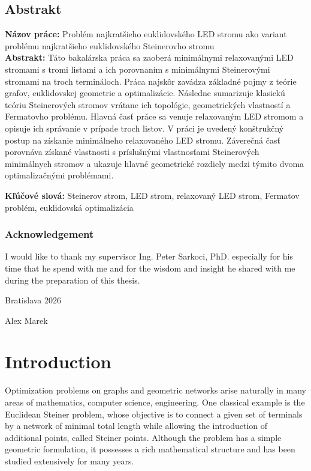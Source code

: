 \documentclass[openany]{book}
\begin{document}
	\section*{Abstrakt}
	
	\noindent \textbf{Názov práce:} Problém najkratšieho euklidovského LED stromu ako variant problému najkratšieho euklidovského Steinerovho stromu\\
	\textbf{Abstrakt:} 
	Táto bakalárska práca sa zaoberá minimálnymi relaxovanými LED stromami s tromi listami a ich porovnaním s minimálnymi Steinerovými stromami na troch termináloch. Práca najskôr zavádza základné pojmy z teórie grafov, euklidovskej geometrie a optimalizácie. Následne sumarizuje klasickú teóriu Steinerových stromov vrátane ich topológie, geometrických vlastností a Fermatovho problému. Hlavná časť práce sa venuje relaxovaným LED stromom a opisuje ich správanie v prípade troch listov. V práci je uvedený konštrukčný postup na získanie minimálneho relaxovaného LED stromu. Záverečná časť porovnáva získané vlastnosti s príslušnými vlastnosťami Steinerových minimálnych stromov a ukazuje hlavné geometrické rozdiely medzi týmito dvoma optimalizačnými problémami.
	
	\vspace{5pt}
	
	\noindent \textbf{Kľúčové slová:} Steinerov strom, LED strom, relaxovaný LED strom, Fermatov problém, euklidovská optimalizácia
	\clearpage
	\thispagestyle{empty}
	\mbox{}


	\vfill
	
	\subsection*{Acknowledgement}
	
	I would like to thank my supervisor Ing. Peter Sarkoci, PhD. especially for his time that he spend with me and for the wisdom and insight he shared with me during the preparation of this thesis.
	
	\vspace{10pt}
	
	\noindent Bratislava 2026 \hfill
	\newline
	
	\begin{flushright}
		Alex Marek \qquad
	\end{flushright}
	
		\tableofcontents
	
	\setcounter{page}{5}
	\chapter{Introduction}
	Optimization problems on graphs and geometric networks arise naturally in many areas of mathematics, computer science, engineering. One classical example is the Euclidean Steiner problem, whose objective is to connect a given set of terminals by a network of minimal total length while allowing the introduction of additional points, called Steiner points. Although the problem has a simple geometric formulation, it possesses a rich mathematical structure and has been studied extensively for many years.
	
\end{document}

